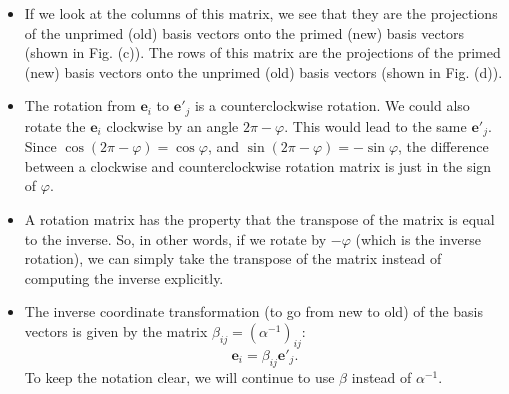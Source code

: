 \begin{itemize}
\item If we look at the columns of this matrix, we see that they are the projections of the unprimed (old) basis vectors onto
the primed (new) basis vectors (shown in Fig. (c)).  The rows of this matrix are the projections of the primed (new) basis vectors 
onto the unprimed (old) basis vectors (shown in Fig. (d)).  
\item  The rotation from $\mathbf{e}_{i}$ to $\mathbf{e}'_{j}$ is a counterclockwise rotation.  We could also rotate the $\mathbf{e}_{i}$ clockwise by
an angle $2\pi-\varphi$.  This would lead to the same $\mathbf{e}'_{j}$.  Since $\cos(2\pi-\varphi)=\cos\varphi$, and $\sin(2\pi-\varphi)=-\sin\varphi$,
the difference between a clockwise and counterclockwise rotation matrix is just in the sign of $\varphi$.  
\item A rotation matrix has the property that the transpose of the matrix is equal to the inverse.  So, in other words, if we rotate by $-\varphi$ (which is 
the inverse rotation), we can simply take the transpose of the matrix instead of computing the inverse explicitly.
\item The inverse coordinate transformation (to go from new to old) of the basis vectors is given by the matrix $\beta_{ij}=(\alpha^{-1})_{ij}$:
\begin{equation}
	\mathbf{e}_{i} = \beta_{ij}\mathbf{e}'_{j}.
\end{equation}
To keep the notation clear, we will continue to use $\beta$ instead of $\alpha^{-1}$.
\end{itemize}

